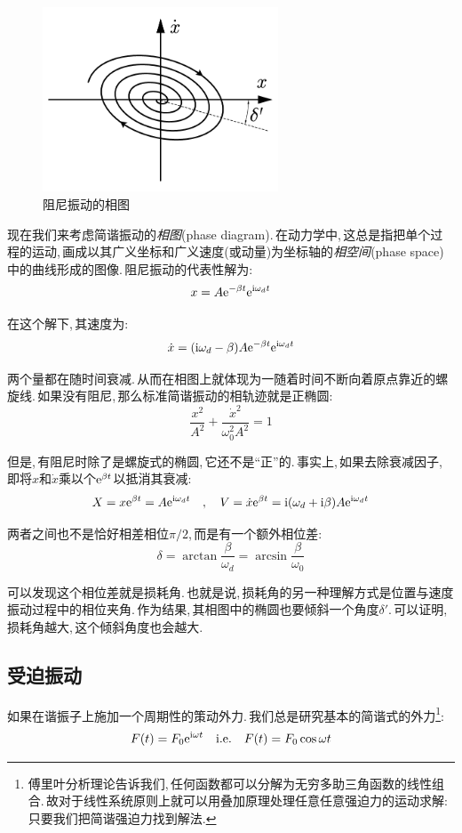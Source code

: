 \begin{figure}
\centering
\includegraphics[width=7cm]{image/6-3-3.png}
\caption{阻尼振动的相图}
\end{figure}
现在我们来考虑简谐振动的\emph{相图}(phase diagram).\,在动力学中,\,这总是指把单个过程的运动,\,画成以其广义坐标和广义速度(或动量)为坐标轴的\emph{相空间}(phase space)中的曲线形成的图像.\,阻尼振动的代表性解为:
\[x=A{\rm e}^{-\beta t}{\rm e}^{{\rm i} \omega_d t}\]

在这个解下,\,其速度为:
\[\dot{x}=({\rm i}\omega_d-\beta)A{\rm e}^{-\beta t}{\rm e}^{{\rm i} \omega_d t}\]

两个量都在随时间衰减.\,从而在相图上就体现为一随着时间不断向着原点靠近的螺旋线.\,如果没有阻尼,\,那么标准简谐振动的相轨迹就是正椭圆:
\[\frac{x^2	}{A^2}+\frac{\dot{x}^2}{\omega_0^2A^2}=1\]

但是,\,有阻尼时除了是螺旋式的椭圆,\,它还不是``正''的.\,事实上,\,如果去除衰减因子,\,即将$x$和$\dot{x}$乘以个${\rm e}^{\beta t}$以抵消其衰减:
\[X=x{\rm e}^{\beta t}=A{\rm e}^{{\rm i} \omega_d t}\quad,\quad V=\dot{x}{\rm e}^{\beta t}={\rm i}(\omega_d+{\rm i}\beta)A{\rm e}^{{\rm i} \omega_d t}\]

两者之间也不是恰好相差相位$\pi/2$,\,而是有一个额外相位差:
\[\delta=\arctan\frac{\beta}{\omega_d}=\arcsin\frac{\beta}{\omega_0}\]

可以发现这个相位差就是损耗角.\,也就是说,\,损耗角的另一种理解方式是位置与速度振动过程中的相位夹角.\,作为结果,\,其相图中的椭圆也要倾斜一个角度$\delta'$.\,可以证明,\,损耗角越大,\,这个倾斜角度也会越大.

\subsection{受迫振动}

如果在谐振子上施加一个周期性的策动外力.\,我们总是研究基本的简谐式的外力\footnote{傅里叶分析理论告诉我们,\,任何函数都可以分解为无穷多助三角函数的线性组合.\,故对于线性系统原则上就可以用叠加原理处理任意任意强迫力的运动求解:\,只要我们把简谐强迫力找到解法.}:
\[F(t)=F_0{\rm e}^{{\rm i}\omega t}\quad {\rm i.e.}\quad F(t)=F_0\cos{\omega t}\]

